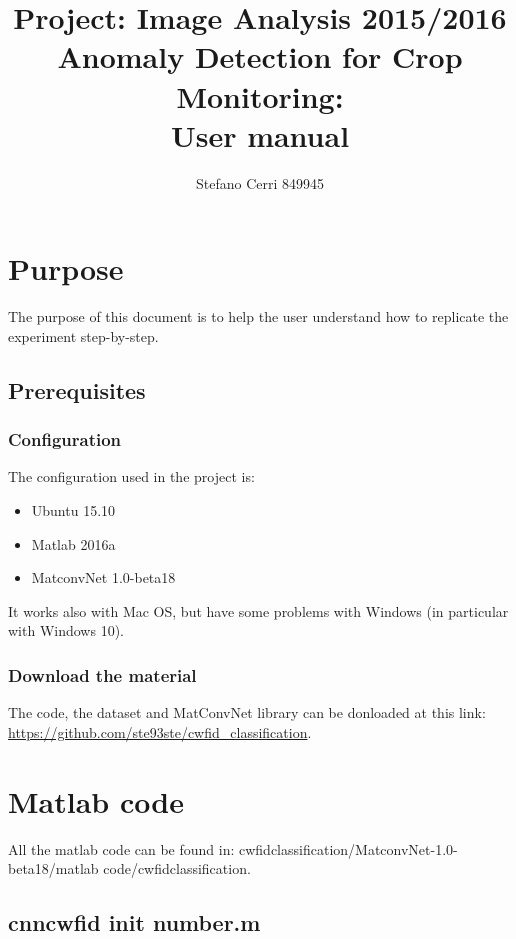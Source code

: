 \documentclass[]{report}
\title{Project: Image Analysis 2015/2016\\Anomaly Detection for Crop Monitoring:\\ User manual}
\author{Stefano Cerri 849945}
\begin{document}
\maketitle
\tableofcontents

\chapter{Purpose}

The purpose of this document is to help the user understand how to replicate the experiment step-by-step.

\section{Prerequisites}

\subsection{Configuration}

The configuration used in the project is:

\begin{itemize}

	\item Ubuntu 15.10
	\item Matlab 2016a
	\item MatconvNet 1.0-beta18

\end{itemize}

It works also with Mac OS, but have some problems with Windows (in particular with Windows 10).

\subsection{Download the material}

The code, the dataset and MatConvNet library can be donloaded at this link: \url{https://github.com/ste93ste/cwfid_classification}.
 
\chapter{Matlab code}

All the matlab code can be found in: cwfid\textunderscore classification/MatconvNet-1.0-beta18/matlab code/cwfid\textunderscore classification.

\section{cnn\textunderscore cwfid \textunderscore init \textunderscore *number.m}
\end{document}
